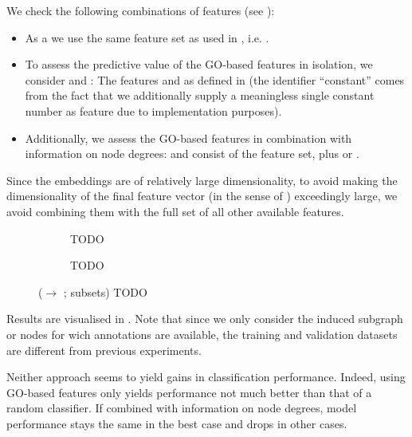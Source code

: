 \documentclass[
	fontsize=10pt, %
	twoside=false, %
	secnumdepth=1, %
  toc=indentunnumbered %
]{kaobook}
\begin{document}
We check the following combinations of features (see ):
\begin{itemize}
\item As a  we use the same feature set as used in
  , i.e. .
\item To assess the predictive value of the GO-based features in isolation, we consider
   and : The features
   and  as defined in
   (the identifier ``constant'' comes from the fact
  that we additionally supply a meaningless single constant number as feature
  due to implementation purposes).
\item Additionally, we assess the GO-based features in combination with
  information on node degrees:  and  consist
  of the  feature set, plus  or .
\end{itemize}
Since the embeddings are of relatively large dimensionality, to avoid making the
dimensionality of the final feature vector (in the sense of
) exceedingly large, we avoid combining them with the
full set of all other available features.


\begin{figure}[h]
  \centering
  \begin{subfigure}{0.48\linewidth}
    \caption{TODO}
  \end{subfigure}
  \begin{subfigure}{0.48\linewidth}
    \caption{TODO}
  \end{subfigure}
  \caption{(\ADLast $\rightarrow$ \PDMap; subsets) TODO}
  \label{fig:annotations-results}
\end{figure}

Results are visualised in . Note that since we only
consider the induced subgraph or nodes for wich annotations are available, the
training and validation datasets are different from previous experiments.

Neither approach seems to yield gains in classification performance. Indeed,
using GO-based features only yields performance not much better than that of a
random classifier. If combined with information on node degrees, model
performance stays the same in the best case and drops in other cases.
\end{document}
